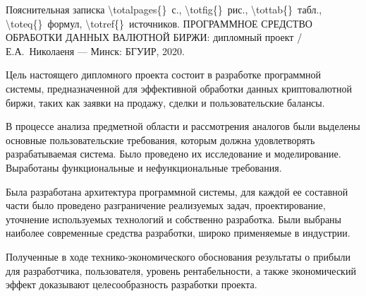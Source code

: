 \thispagestyle{empty}


\begin{center}
    Пояснительная записка \num{\totalpages{}}~с., \num{\totfig{}}~рис., \num{\tottab{}}~табл., \num{\toteq{}}~формул, \num{\totref{}}~источников.
	\MakeUppercase{Программное средство обработки данных валютной биржи}: дипломный проект / Е.А.~Николаеня — Минск: БГУИР, 2020.
\end{center}

Цель настоящего дипломного проекта состоит в разработке программной системы, предназначенной для эффективной обработки данных криптовалютной биржи, таких как заявки на продажу, сделки и пользовательские балансы.

В процессе анализа предметной области и рассмотрения аналогов были выделены основные пользовательские требования, которым должна удовлетворять разрабатываемая система. Было проведено их исследование и моделирование. Выработаны функциональные и нефункциональные требования.

Была разработана архитектура программной системы, для каждой ее составной части было проведено разграничение реализуемых задач, проектирование, уточнение используемых технологий и собственно разработка. Были выбраны наиболее современные средства разработки, широко применяемые в индустрии. 

Полученные в ходе технико-экономического обоснования результаты о прибыли для разработчика, пользователя, уровень рентабельности, а также экономический эффект доказывают целесообразность разработки проекта.
